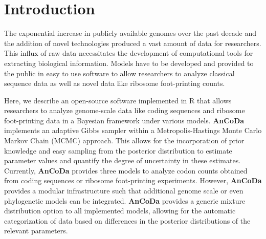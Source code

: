 \documentclass{bioinfo}
\newcommand{\package}{\textbf{AnCoDa }} %
\begin{document}
\section*{Introduction}
The exponential increase in publicly available genomes over the past decade and the addition of novel technologies produced a vast amount of data for researchers.  
This influx of raw data necessitates the development of computational tools for extracting biological information. 
Models have to be developed and provided to the public in easy to use software to allow researchers to analyze classical sequence data as well as novel data like ribosome foot-printing counts.

Here, we describe an open-source software implemented in R \citep{rcore} that allows researchers to analyze genome-scale data like coding sequences and ribosome foot-printing data in a Bayesian framework under various models. 
\package implements an adaptive Gibbs sampler within a Metropolis-Hastings Monte Carlo Markov Chain (MCMC) approach. This allows for the incorporation of prior knowledge and easy sampling from the posterior distribution to estimate parameter values and quantify the degree of uncertainty in these estimates.
Currently, \package provides three models to analyze codon counts obtained from coding sequences or ribosome foot-printing experiments. However, \package provides a modular infrastructure such that additional genome scale or even phylogenetic models can be integrated. 
\package provides a generic mixture distribution option to all implemented models, allowing for the automatic categorization of data based on differences in the posterior distributions of the relevant parameters.
\end{document}
